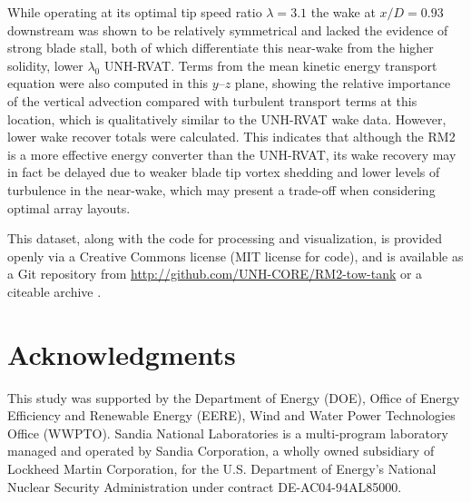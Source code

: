 \documentclass[10pt,letterpaper]{article}
\begin{document}
While operating at its optimal tip speed ratio $\lambda=3.1$ the wake at
$x/D=0.93$ downstream was shown to be relatively symmetrical and lacked the
evidence of strong blade stall, both of which differentiate this near-wake from
the higher solidity, lower $\lambda_0$ UNH-RVAT. Terms from the mean kinetic
energy transport equation were also computed in this $y$--$z$ plane, showing the
relative importance of the vertical advection compared with turbulent transport
terms at this location, which is qualitatively similar to the UNH-RVAT wake
data. However, lower wake recover totals were calculated. This indicates that
although the RM2 is a more effective energy converter than the UNH-RVAT, its
wake recovery may in fact be delayed due to weaker blade tip vortex shedding and
lower levels of turbulence in the near-wake, which may present a trade-off when
considering optimal array layouts.

This dataset, along with the code for processing and visualization, is provided
openly via a Creative Commons license (MIT license for code), and is available
as a Git repository from \url{http://github.com/UNH-CORE/RM2-tow-tank} or a
citeable archive \cite{Bachant2015-RM2-data}.


\section*{Acknowledgments}

This study was supported by the Department of Energy (DOE), Office of Energy
Efficiency and Renewable Energy (EERE), Wind and Water Power Technologies Office
(WWPTO). Sandia National Laboratories is a multi-program laboratory managed and
operated by Sandia Corporation, a wholly owned subsidiary of Lockheed Martin
Corporation, for the U.S. Department of Energy's National Nuclear Security
Administration under contract DE-AC04-94AL85000.

\nolinenumbers

%


\end{document}
